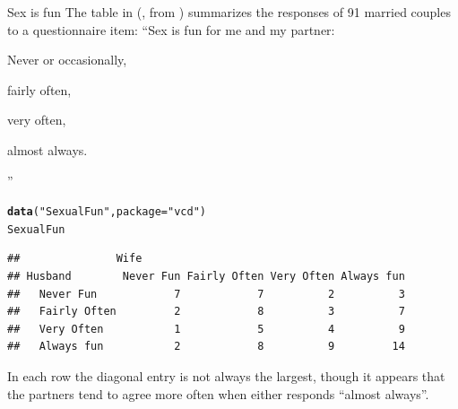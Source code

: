 \documentclass[11pt]{book}\usepackage[]{graphicx}\usepackage[]{color}
\makeatletter
\newcommand{\hlstr}[1]{\textcolor[rgb]{0.192,0.494,0.8}{#1}}%
\newcommand{\hlstd}[1]{\textcolor[rgb]{0.345,0.345,0.345}{#1}}%
\newcommand{\hlkwc}[1]{\textcolor[rgb]{0.333,0.667,0.333}{#1}}%
\newcommand{\hlkwd}[1]{\textcolor[rgb]{0.737,0.353,0.396}{\textbf{#1}}}%
\newenvironment{kframe}{%
 \def\at@end@of@kframe{}%
 \ifinner\ifhmode%
  \def\at@end@of@kframe{\end{minipage}}%
  \begin{minipage}{\columnwidth}%
 \fi\fi%
 \def\FrameCommand##1{\hskip\@totalleftmargin \hskip-\fboxsep
 \colorbox{shadecolor}{##1}\hskip-\fboxsep
     \hskip-\linewidth \hskip-\@totalleftmargin \hskip\columnwidth}%
 \MakeFramed {\advance\hsize-\width
   \@totalleftmargin\z@ \linewidth\hsize
   \@setminipage}}%
 {\par\unskip\endMakeFramed%
 \at@end@of@kframe}
\newenvironment{knitrout}{}{} %
\renewenvironment{knitrout}{\small\renewcommand{\baselinestretch}{.85}}{} %
\makeatother
\begin{document}
\begin{Example}[sexisfun1]{Sex is fun} 
The  table in 
(\citet[Table 2.10]{Agresti:90}, from \citet{Hout-etal:87})
 summarizes the responses of 91
married couples to a questionnaire item:
``Sex is fun for me and my partner: 
\begin{seriate}
  \item Never or occasionally, 
  \item fairly often, 
  \item very often, 
  \item almost always.
\end{seriate}
''
\begin{knitrout}
\color{fgcolor}\begin{kframe}
\begin{alltt}
\hlkwd{data}\hlstd{(}\hlstr{"SexualFun"}\hlstd{,} \hlkwc{package}\hlstd{=}\hlstr{"vcd"}\hlstd{)}
\hlstd{SexualFun}
\end{alltt}
\begin{verbatim}
##               Wife
## Husband        Never Fun Fairly Often Very Often Always fun
##   Never Fun            7            7          2          3
##   Fairly Often         2            8          3          7
##   Very Often           1            5          4          9
##   Always fun           2            8          9         14
\end{verbatim}
\end{kframe}
\end{knitrout}


In each row the diagonal entry is not always the largest, though it
appears that the partners tend to agree more often when either responds
``almost always''.
%
\end{Example}
\end{document}

